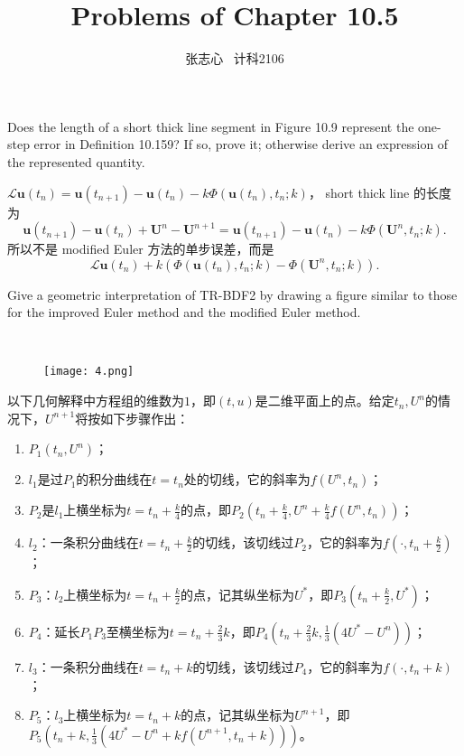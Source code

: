 \documentclass[lang=cn,a4paper,newtx,bibend=bibtex]{elegantpaper}
\title{Problems of Chapter 10.5}
\author{张志心 \ 计科2106}
\date{\zhdate{2024/04/30}}
\begin{document}
\maketitle

\begin{prob}[Exercise 10.156]
  Does the length of a short thick line segment in Figure 10.9 represent the one-step error in Definition
  10.159? If so, prove it; otherwise derive an expression of the
  represented quantity.
\end{prob}

\begin{solution}
  $\mathcal{L} \bm{u} (t_n) = \bm{u} (t_{n+1}) - \bm{u}(t_n) - k \Phi(\bm{u}(t_n), t_n; k)$，
  short thick line 的长度为
  \[
    \bm{u} (t_{n+1}) - \bm{u} (t_n) + \bm{U}^{n} - \bm{U}^{n+1} = 
    \bm{u} (t_{n+1}) - \bm{u} (t_n) - k \Phi (\bm{U}^n, t_n; k).
  \]
  所以不是 modified Euler 方法的单步误差，而是
  \[
    \mathcal{L} \bm{u} (t_n) + k(\Phi(\bm{u}(t_n), t_n; k) - \Phi (\bm{U}^n, t_n; k)).
  \]
\end{solution}

\begin{prob}[Exercise 10.158]
  Give a geometric interpretation of TR-BDF2 
  by drawing a figure similar to those for the improved
  Euler method and the modified Euler method.
\end{prob}

\begin{solution}~~\\
  \begin{figure}[H]
    \centering
    \texttt{[image: 4.png]}
  \end{figure}
  以下几何解释中方程组的维数为$1$，即$(t,u)$是二维平面上的点。给定$t_n,U^n$的情况下，$U^{n+1}$将按如下步骤作出：
    \begin{enumerate}
        \item $P_1(t_n,U^n)$；
        \item $l_1$是过$P_1$的积分曲线在$t=t_n$处的切线，它的斜率为$f(U^n,t_n)$；
        \item $P_2$是$l_1$上横坐标为$t=t_n+\frac k4$的点，即$P_2(t_n+\frac k4,U^n+\frac k4 f(U^n,t_n))$；
        \item $l_2$：一条积分曲线在$t=t_n+\frac k2$的切线，该切线过$P_2$，它的斜率为$f(\cdot,t_n+\frac k2)$；
        \item $P_3$：$l_2$上横坐标为$t=t_n+\frac k2$的点，记其纵坐标为$U^*$，即$P_3(t_n+\frac k2,U^*)$；
        \item $P_4$：延长$P_1P_3$至横坐标为$t=t_n+\frac 23 k$，即$P_4(t_n+\frac 23 k,\frac 13(4U^*-U^n))$；
        \item $l_3$：一条积分曲线在$t=t_n+k$的切线，该切线过$P_4$，它的斜率为$f(\cdot,t_n+k)$；
        \item $P_5$：$l_3$上横坐标为$t=t_n+k$的点，记其纵坐标为$U^{n+1}$，即$P_5(t_n+k,\frac 13(4U^*-U^n+kf(U^{n+1},t_n+k)))$。
    \end{enumerate}
\end{solution}
\end{document}

